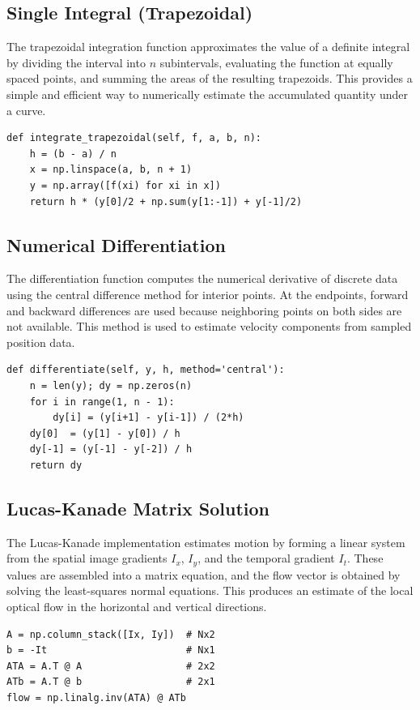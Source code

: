 \documentclass[letterpaper,twocolumn,fleqn]{article}
\begin{document}
\subsection{Single Integral (Trapezoidal)}
The trapezoidal integration function approximates the value of a definite integral by dividing the interval into \(n\) subintervals, evaluating the function at equally spaced points, and summing the areas of the resulting trapezoids. This provides a simple and efficient way to numerically estimate the accumulated quantity under a curve.

\begin{lstlisting}
def integrate_trapezoidal(self, f, a, b, n):
    h = (b - a) / n
    x = np.linspace(a, b, n + 1)
    y = np.array([f(xi) for xi in x])
    return h * (y[0]/2 + np.sum(y[1:-1]) + y[-1]/2)
\end{lstlisting}

\subsection{Numerical Differentiation}
The differentiation function computes the numerical derivative of discrete data using the central difference method for interior points. At the endpoints, forward and backward differences are used because neighboring points on both sides are not available. This method is used to estimate velocity components from sampled position data.

\begin{lstlisting}
def differentiate(self, y, h, method='central'):
    n = len(y); dy = np.zeros(n)
    for i in range(1, n - 1):
        dy[i] = (y[i+1] - y[i-1]) / (2*h)
    dy[0]  = (y[1] - y[0]) / h
    dy[-1] = (y[-1] - y[-2]) / h
    return dy
\end{lstlisting}

\subsection{Lucas-Kanade Matrix Solution}
The Lucas-Kanade implementation estimates motion by forming a linear system from the spatial image gradients \(I_x\), \(I_y\), and the temporal gradient \(I_t\). These values are assembled into a matrix equation, and the flow vector is obtained by solving the least-squares normal equations. This produces an estimate of the local optical flow in the horizontal and vertical directions.

\begin{lstlisting}
A = np.column_stack([Ix, Iy])  # Nx2
b = -It                        # Nx1
ATA = A.T @ A                  # 2x2
ATb = A.T @ b                  # 2x1
flow = np.linalg.inv(ATA) @ ATb
\end{lstlisting}
\end{document}
